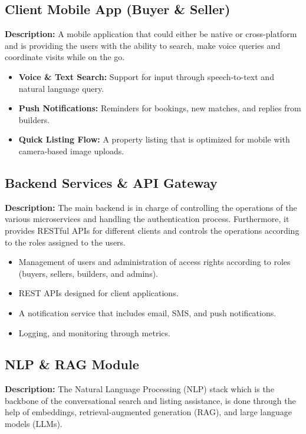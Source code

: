 \subsection{Client Mobile App (Buyer \& Seller)}

\textbf{Description:} A mobile application that could either be native or cross-platform and is providing the users with the ability to search, make voice queries and coordinate visits while on the go.

\begin{itemize}
    \item \textbf{Voice \& Text Search:} Support for input through speech-to-text and natural language query.
    \item \textbf{Push Notifications:} Reminders for bookings, new matches, and replies from builders.
    \item \textbf{Quick Listing Flow:} A property listing that is optimized for mobile with camera-based image uploads.
\end{itemize}

\subsection{Backend Services \& API Gateway}

\textbf{Description:} The main backend is in charge of controlling the operations of the various microservices and handling the authentication process. Furthermore, it provides RESTful APIs for different clients and controls the operations according to the roles assigned to the users.

\begin{itemize}
    \item Management of users and administration of access rights according to roles (buyers, sellers, builders, and admins).
    \item REST APIs designed for client applications.
    \item A notification service that includes email, SMS, and push notifications.
    \item Logging, and monitoring through metrics.
\end{itemize}

\subsection{NLP \& RAG Module}

\textbf{Description:} The Natural Language Processing (NLP) stack which is the backbone of the conversational search and listing assistance, is done through the help of embeddings, retrieval-augmented generation (RAG), and large language models (LLMs).

